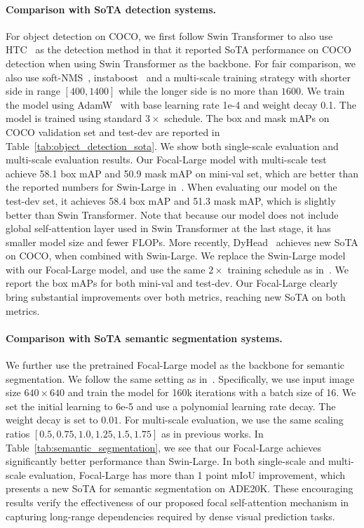 \documentclass{article}
\begin{document}
\paragraph{Comparison with SoTA detection systems.}
For object detection on COCO, we first follow Swin Transformer to also use HTC~\cite{chen2019hybrid} as the detection method in that it reported SoTA performance on COCO detection when using Swin Transformer as the backbone. For fair comparison, we also use soft-NMS~\cite{bodla2017soft}, instaboost~\cite{fang2019instaboost} and a multi-scale training strategy with shorter side in range $[400, 1400]$ while the longer side is no more than $1600$. We train the model using AdamW~\cite{loshchilov2017decoupled} with base learning rate 1e-4 and weight decay 0.1. The model is trained using standard $3\times$ schedule. The box and mask mAPs on COCO validation set and test-dev are reported in Table~\ref{tab:object_detection_sota}. We show both single-scale evaluation and multi-scale evaluation results.
Our Focal-Large model with multi-scale test achieve 58.1 box mAP and 50.9 mask mAP on mini-val set, which are better than the reported numbers for Swin-Large in~\cite{liu2021swin}. When evaluating our model on the test-dev set, it achieves 58.4 box mAP and 51.3 mask mAP, which is slightly better than Swin Transformer. Note that because our model does not include global self-attention layer used in Swin Transformer at the last stage, it has smaller model size and fewer FLOPs. 
More recently, DyHead~\cite{dai2021dynamic} achieves new SoTA on COCO, when combined with Swin-Large. We replace the Swin-Large model with our Focal-Large model, and use the same $2\times$  training schedule as in~\cite{dai2021dynamic}. We report the box mAPs for both mini-val and test-dev. Our Focal-Large clearly bring substantial improvements over both metrics, reaching new SoTA on both metrics.



\paragraph{Comparison with SoTA semantic segmentation systems.}
We further use the pretrained Focal-Large model as the backbone for semantic segmentation. We follow the same setting as in~\cite{liu2021swin}. Specifically, we use input image size $640\times640$ and train the model for 160k iterations with a batch size of 16. We set the initial learning to 6e-5 and use a polynomial learning rate decay. The weight decay is set to $0.01$. For multi-scale evaluation, we use the same scaling ratios $[0.5,0.75,1.0,1.25,1.5,1.75]$ as in previous works. In Table~\ref{tab:semantic_segmentation}, we see that our Focal-Large achieves significantly better performance than Swin-Large. In both single-scale and multi-scale evaluation, Focal-Large has more than 1 point mIoU improvement, which presents a new SoTA for semantic segmentation on ADE20K. These encouraging results verify the effectiveness of our proposed focal self-attention mechanism in capturing long-range dependencies required by dense visual prediction tasks.
\end{document}
